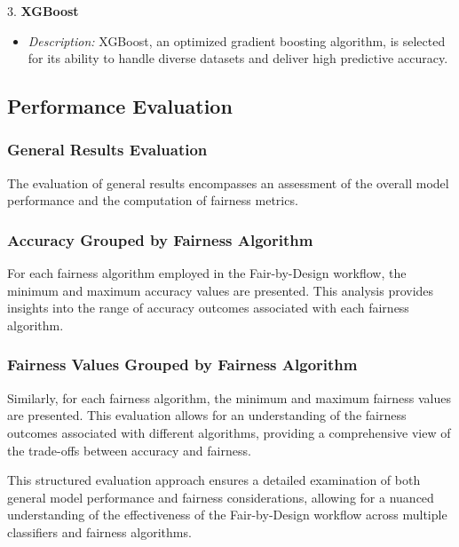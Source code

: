 3. \textbf{XGBoost}
   \begin{itemize}
       \item \textit{Description:} XGBoost, an optimized gradient boosting algorithm, is selected for its ability to handle diverse datasets and deliver high predictive accuracy.
   \end{itemize}

\subsection{Performance Evaluation}

\subsubsection{General Results Evaluation}

The evaluation of general results encompasses an assessment of the overall model performance and the computation of fairness metrics.

\subsubsection{Accuracy Grouped by Fairness Algorithm}

For each fairness algorithm employed in the Fair-by-Design workflow, the minimum and maximum accuracy values are presented. This analysis provides insights into the range of accuracy outcomes associated with each fairness algorithm.

\subsubsection{Fairness Values Grouped by Fairness Algorithm}

Similarly, for each fairness algorithm, the minimum and maximum fairness values are presented. This evaluation allows for an understanding of the fairness outcomes associated with different algorithms, providing a comprehensive view of the trade-offs between accuracy and fairness.

This structured evaluation approach ensures a detailed examination of both general model performance and fairness considerations, allowing for a nuanced understanding of the effectiveness of the Fair-by-Design workflow across multiple classifiers and fairness algorithms.